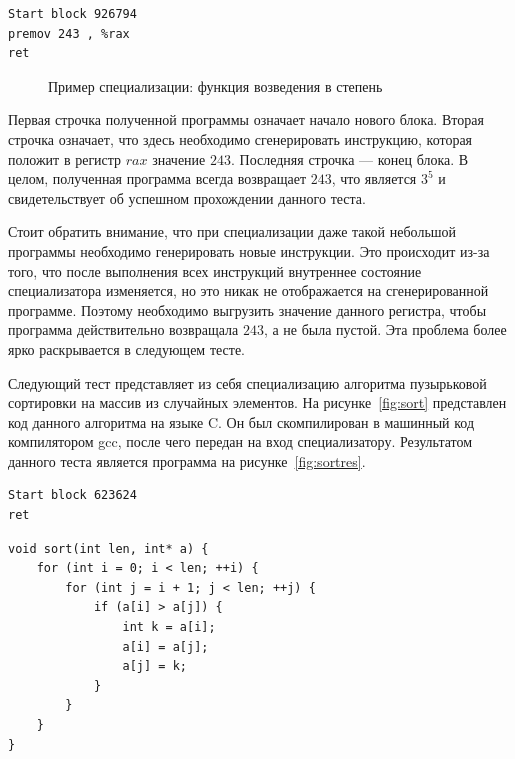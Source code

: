 \newsavebox\boxeight
\begin{lrbox}{\boxeight}
\begin{lstlisting}[xleftmargin = 20pt]
Start block 926794
premov 243 , %rax 
ret
\end{lstlisting}
\end{lrbox}

\begin{figure}[!t]
\hfill
{}
\caption{Пример специализации: функция возведения в степень}
\end{figure}

Первая строчка полученной программы означает начало нового блока. Вторая строчка означает, что здесь необходимо сгенерировать инструкцию, которая положит в регистр $rax$ значение $243$. Последняя строчка --- конец блока.
В целом, полученная программа всегда возвращает $243$, что является $3^5$ и свидетельствует об успешном прохождении данного теста. 

Стоит обратить внимание, что при специализации даже такой небольшой программы необходимо генерировать новые инструкции. Это происходит из-за того, что после выполнения всех инструкций внутреннее состояние специализатора изменяется, но это никак не отображается на сгенерированной программе. Поэтому необходимо выгрузить значение данного регистра, чтобы программа действительно возвращала $243$, а не была пустой. Эта проблема более ярко раскрывается в следующем тесте.

Следующий тест представляет из себя специализацию алгоритма пузырьковой сортировки на массив из случайных элементов. На рисунке~\ref{fig:sort} представлен код данного алгоритма на языке \textsf{C}. Он был скомпилирован в машинный код компилятором gcc, после чего передан на вход специализатору.
Результатом данного теста является программа на рисунке~\ref{fig:sortres}.

\newsavebox\boxnine
\begin{lrbox}{\boxnine}
\begin{lstlisting}[xleftmargin = 20pt]
Start block 623624
ret
\end{lstlisting}
\end{lrbox}

\newsavebox\boxten
\begin{lrbox}{\boxten}
\begin{lstlisting}[xleftmargin = 20pt]
void sort(int len, int* a) {
    for (int i = 0; i < len; ++i) {
        for (int j = i + 1; j < len; ++j) {
            if (a[i] > a[j]) {
                int k = a[i];
                a[i] = a[j];
                a[j] = k;
            }
        }
    }
}
\end{lstlisting}
\end{lrbox}


